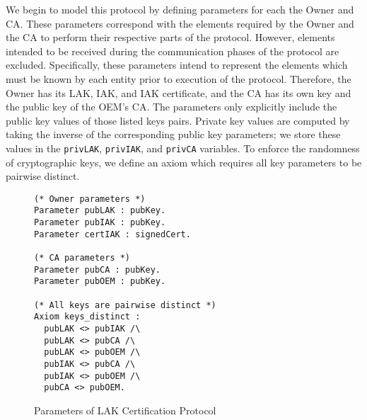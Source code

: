 We begin to model this protocol by defining parameters for each the Owner and CA. These parameters correspond with the elements required by the Owner and the CA to perform their respective parts of the protocol. However, elements intended to be received during the communication phases of the protocol are excluded. Specifically, these parameters intend to represent the elements which must be known by each entity prior to execution of the protocol. Therefore, the Owner has its LAK, IAK, and IAK certificate, and the CA has its own key and the public key of the OEM's CA. The parameters only explicitly include the public key values of those listed keys pairs. Private key values are computed by taking the inverse of the corresponding public key parameters; we store these values in the \verb|privLAK|, \verb|privIAK|, and \verb|privCA| variables. To enforce the randomness of cryptographic keys, we define an axiom which requires all key parameters to be pairwise distinct. 
\begin{figure}[h]
\begin{lstlisting}[language=Coq]
(* Owner parameters *)
Parameter pubLAK : pubKey.
Parameter pubIAK : pubKey.
Parameter certIAK : signedCert.

(* CA parameters *)
Parameter pubCA : pubKey.
Parameter pubOEM : pubKey.

(* All keys are pairwise distinct *)
Axiom keys_distinct :
  pubLAK <> pubIAK /\
  pubLAK <> pubCA /\
  pubLAK <> pubOEM /\
  pubIAK <> pubCA /\
  pubIAK <> pubOEM /\
  pubCA <> pubOEM.
\end{lstlisting}
\caption{Parameters of LAK Certification Protocol}
\end{figure}

